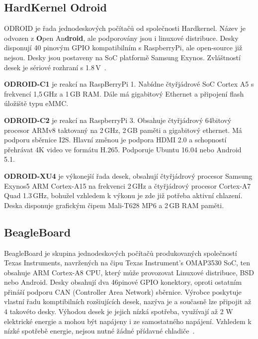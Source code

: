 \subsection{HardKernel Odroid}
	\label{KapKernel}
ODROID je řada jednodeskových počítačů od společnosti Hardkernel. Název je odvozen z \textbf{O}pen An\textbf{droid}, ale podporovány jsou i linuxové distribuce. Desky disponují 40 pinovým GPIO kompatibilním s RaspberryPi, ale open-source již nejsou. Desky jsou postaveny na SoC platformě Samsung Exynos. Zvláštností desek je sériové rozhraní s 1.8\,V~\cite{HardKernel}.
	
	\textbf{ODROID-C1} je reakcí na RaspBerryPi 1. Nabídne čtyřjádrové SoC Cortex A5 s frekvencí 1,5\,GHz a 1\,GB RAM. Dále má gigabitový Ethernet a připojení flash úložiště typu eMMC. 

	\textbf{ODROID-C2} je reakcí na RaspberryPi 3. Obsahuje čtyřjádrový 64bitový procesor ARMv8 taktovaný na 2\,GHz, 2\,GB paměti a gigabitový ethernet. Má podporu sběrnice I2S. Hlavní změnou je podpora HDMI 2.0 a schopností přehrávat 4K video ve formátu H.265. Podporuje Ubuntu 16.04 nebo Android 5.1. 
	
	\textbf{ODROID-XU4} je výkonejší řada desek, obsahují čtyřjádrový procesor Samsung Exynos5 ARM Cortex-A15 na frekvenci 2\,GHz a čtyřjádrový procesor Cortex-A7 Quad 1.3\,GHz, bohužel vzhledem k výkonu je zde již potřeba aktivní chlazení. Deska disponuje grafickým čipem Mali-T628 MP6 a 2\,GB RAM paměti.

	
\subsection{BeagleBoard }
BeagleBoard je skupina jednodeskových počítačů produkovaných společností Texas Instruments, navržených na čipu Texas Instrument's OMAP3530 SoC, ten obsahuje ARM Cortex-A8 CPU, který může provozovat Linuxové distribuce, BSD nebo Android. Desky obsahují dva 46pinové GPIO konektory, oproti ostatním přináší podporu CAN (Controller Area Network) sběrnice. Výrobce poskytuje vlastní řadu komptibilních rozšiujících desek, nazýva je  a současně lze připojit až 4 takovéto desky. Výhodou desek je jejich nízká spotřeba, využívají až 2 W elektrické energie a mohou být napájeny i ze samostatného napájení. Vzhledem k nízké spotřebě energie, nejsou nutné žádné přídavné chladiče~\cite{BeagleBone}.

